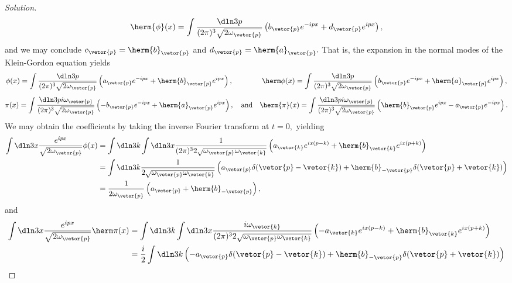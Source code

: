 \begin{proof}[Solution]
\begin{equation*}
      \herm{\phi}(x) = \int\frac{\dln3p}{(2\pi)^3 \sqrt{2\omega_{\vetor{p}}}} \left(b_{\vetor{p}}e^{-ipx} + d_{\vetor{p}}e^{ipx}\right),
   \end{equation*}
   and we may conclude \(c_{\vetor{p}} = \herm{b}_{\vetor{p}}\) and \(d_{\vetor{p}} = \herm{a}_{\vetor{p}}.\) That is, the expansion in the normal modes of the Klein-Gordon equation yields
   \begin{equation*}
      \phi(x) = \int \frac{\dln3p}{(2\pi)^3 \sqrt{2\omega_{\vetor{p}}}} \left(a_{\vetor{p}} e^{-ipx} + \herm{b}_{\vetor{p}} e^{ipx}\right),\qquad\qquad
      \herm\phi(x) = \int \frac{\dln3p}{(2\pi)^3 \sqrt{2\omega_{\vetor{p}}}} \left(b_{\vetor{p}} e^{-ipx} + \herm{a}_{\vetor{p}} e^{ipx}\right),
   \end{equation*}
   \begin{equation*}
      \pi(x) = \int \frac{\dln3p i\omega_{\vetor{p}}}{(2\pi)^3 \sqrt{2\omega_{\vetor{p}}}} \left(-b_{\vetor{p}} e^{-ipx} + \herm{a}_{\vetor{p}} e^{ipx}\right),
      \quad\text{and}\quad
      \herm{\pi}(x) = \int\frac{\dln3p i \omega_{\vetor{p}}}{(2\pi)^3 \sqrt{2\omega_{\vetor{p}}}} \left(\herm{b}_{\vetor{p}}e^{ipx} - a_{\vetor{p}}e^{-ipx}\right).
   \end{equation*}
   We may obtain the coefficients by taking the inverse Fourier transform at \(t = 0,\) yielding
   \begin{align*}
      \int \dln3x \frac{e^{ipx}}{\sqrt{2\omega_{\vetor{p}}}}\phi(x) &= \int \dln3k \int \dln3x \frac{1}{(2\pi)^3 2\sqrt{\omega_{\vetor{p}}\omega_{\vetor{k}}}} \left(a_{\vetor{k}}e^{ix(p - k)}+ \herm{b}_{\vetor{k}} e^{ix(p + k)}\right)\\
                                                     &= \int \dln3k \frac{1}{2\sqrt{\omega_{\vetor{p}}\omega_{\vetor{k}}}} \left(a_{\vetor{p}} \delta(\vetor{p} - \vetor{k}) + \herm{b}_{-\vetor{p}} \delta(\vetor{p} + \vetor{k})\right)\\
                                                     &= \frac{1}{2 \omega_{\vetor{p}}} \left(a_{\vetor{p}}  + \herm{b}_{-\vetor{p}} \right),
   \end{align*}
   and
   \begin{align*}
      \int \dln3x \frac{e^{ipx}}{\sqrt{2\omega_{\vetor{p}}}}\herm\pi(x) &= \int \dln3k \int \dln3x \frac{i\omega_{\vetor{k}}}{(2\pi)^3 2\sqrt{\omega_{\vetor{p}}\omega_{\vetor{k}}}} \left(-a_{\vetor{k}}e^{ix(p - k)} + \herm{b}_{\vetor{k}} e^{ix(p + k)}\right)\\
                                                     &= \frac{i}2\int \dln3k \left(-a_{\vetor{p}} \delta(\vetor{p} - \vetor{k}) + \herm{b}_{-\vetor{p}} \delta(\vetor{p} + \vetor{k})\right)\\

\end{align*}
\end{proof}
